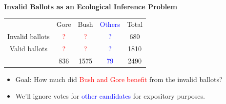 \documentclass[landscape,letterpaper]{seminar}
\begin{document}
\begin{slide}
  \begin{center}
    \textbf{Invalid Ballots as an Ecological Inference Problem}
  \end{center}

\smallskip
\begin{center}
\small
\begin{table}
    \begin{tabular}{ccccc}
      & Gore  & Bush & \textcolor{Blue}{Others} & Total  \\
      \cline{2-4}
      Invalid ballots &   \textcolor{Red}{?}   &   \textcolor{Red}{?}  &   \textcolor{Blue}{?}    &  680   \\
      Valid ballots   &   \textcolor{Red}{?}   &   \textcolor{Red}{?}  &   \textcolor{Blue}{?}    & 1810   \\
      \cline{2-4}
      & 836   & 1575 &   \textcolor{Blue}{79}   & 2490   \\
    \end{tabular} 
\end{table} 
\end{center}

\begin{itemize}
\item Goal: How much did \textcolor{Red}{Bush and Gore benefit} from the invalid ballots?
\item We'll ignore votes for \textcolor{Blue}{other candidates} for expository purposes.
\end{itemize}

\end{slide}

\end{document}
